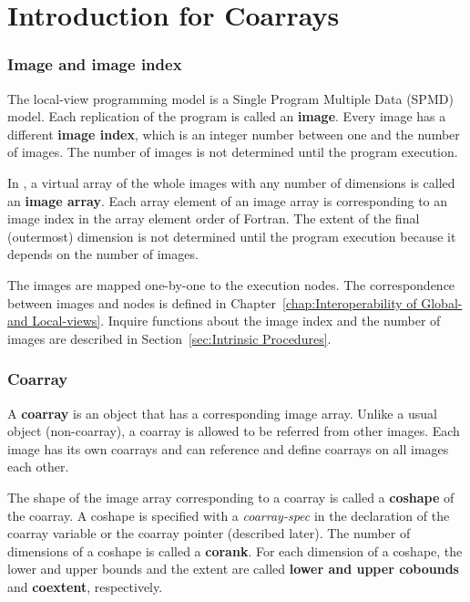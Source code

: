 \section{Introduction for Coarrays}
\label{sec:Introduction for Coarrays}

\subsubsection*{Image and image index}
The local-view programming model is a Single Program Multiple Data (SPMD) model.
Each replication of the program is called an {\bf image}.
Every image has a different {\bf image index}, which is an integer number 
between one and the number of images.
The number of images is not determined until the program execution.

In {\XMP}, a virtual array of the whole images with any number of dimensions 
is called an {\bf image array}. 
Each array element of an image array is corresponding to an image index
in the array element order of Fortran.
The extent of the final (outermost) dimension is not determined until
the program execution because it depends on the number of images.

The images are mapped one-by-one to the execution nodes.
The correspondence between images and nodes is defined in 
Chapter~\ref{chap:Interoperability of Global- and Local-views}.
Inquire functions about the image index and the number of images 
are described in Section~\ref{sec:Intrinsic Procedures}.


\subsubsection*{Coarray}
A {\bf coarray} is an object that has a corresponding image array.
Unlike a usual object (non-coarray), a coarray is allowed to be
referred from other images. 
Each image has its own coarrays and can reference and define 
coarrays on all images each other.

The shape of the image array corresponding to a coarray is 
called a {\bf coshape} of the coarray.
A coshape is specified with a {\it coarray-spec} in the declaration of the 
coarray variable or the coarray pointer (described later).
The number of dimensions of a coshape is called a {\bf corank}.
For each dimension of a coshape, the lower and upper bounds and the extent
are called {\bf lower and upper cobounds} and {\bf coextent}, respectively.


